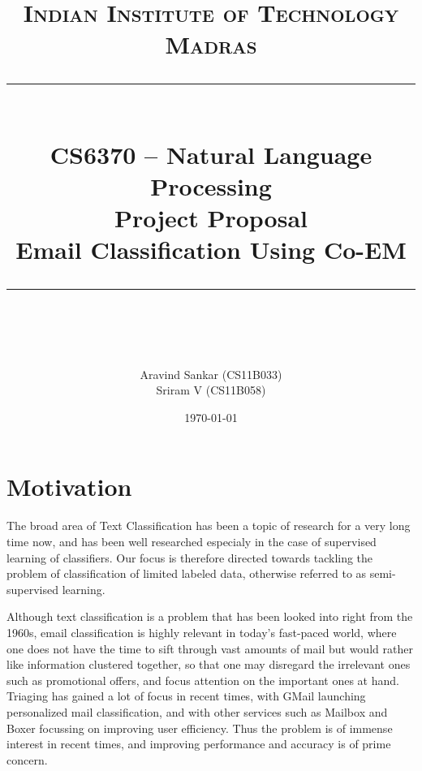 \newcommand{\horrule}[1]{\rule{\linewidth}{#1}} %

\title{	
\normalfont \normalsize 
\textsc{Indian Institute of Technology Madras} \\ [25pt] %
\horrule{0.5pt} \\[0.4cm] %
\huge CS6370 -- Natural Language Processing \\ Project Proposal \\ Email Classification Using Co-EM %
\horrule{2pt} \\[0.5cm] %
}
\author{\large Aravind Sankar (CS11B033) \\ \large Sriram V (CS11B058)} %

\date{\normalsize\today} %



\maketitle

\section{Motivation}

The broad area of Text Classification has been a topic of research for a very long time now, and has been well researched especialy in the case of supervised learning of classifiers. Our focus is therefore directed towards tackling the problem of classification of limited labeled data, otherwise referred to as semi-supervised learning.

Although text classification is a problem that has been looked into right from the 1960s, email classification is highly relevant in today's fast-paced world, where one does not have the time to sift through vast amounts of mail but would rather like information clustered together, so that one may disregard the irrelevant ones such as promotional offers, and focus attention on the important ones at hand. Triaging has gained a lot of focus in recent times, with GMail launching personalized mail classification, and with other services such as Mailbox and Boxer focussing on improving user efficiency. Thus the problem is of immense interest in recent times, and improving performance and accuracy is of prime concern.

